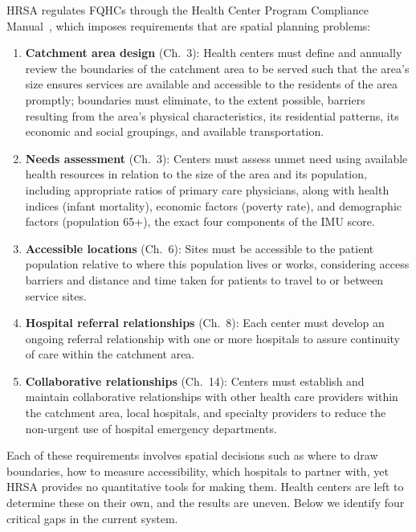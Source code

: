 \documentclass[11pt]{article}
\begin{document}
HRSA regulates FQHCs through the Health Center
Program Compliance Manual~\cite{bphc2025compliance},
which imposes requirements that are spatial
planning problems:

\begin{enumerate}[nosep, label=\textbf{R\arabic*.}]
    \item \label{r:catchment} \textbf{Catchment area design} (Ch.~3): Health centers must define and annually 
    review the boundaries of the catchment area to be served such that the area's size ensures services are 
    available and accessible to the residents of the area promptly; boundaries must eliminate, to the extent 
    possible, barriers resulting from the area's physical characteristics, its residential patterns, its economic 
    and social groupings, and available transportation.
    \item \label{r:needs} \textbf{Needs assessment} (Ch.~3): Centers must assess unmet need using available health 
    resources in relation to the size of the area and its population, including appropriate ratios of primary care 
    physicians, along with health indices (infant mortality), economic factors (poverty rate), and demographic 
    factors (population 65+), the exact four components of the IMU score.
    \item \label{r:locations} \textbf{Accessible locations} (Ch.~6): Sites must be accessible to the patient population 
    relative to where this population lives or works, considering access barriers and distance and time taken 
    for patients to travel to or between service sites.
    \item \label{r:referral} \textbf{Hospital referral relationships} (Ch.~8): Each center must develop an ongoing 
    referral relationship with one or more hospitals to assure continuity of care within the catchment area.
    \item \label{r:collaborative} \textbf{Collaborative relationships} (Ch.~14): Centers must establish and maintain 
    collaborative relationships with other health care providers within the catchment area, local hospitals, and 
    specialty providers to reduce the non-urgent use of hospital emergency departments.
\end{enumerate}

Each of these requirements involves spatial decisions such as where to draw boundaries, how to measure accessibility, 
which hospitals to partner with, yet HRSA provides no quantitative tools for making them. Health centers are left to 
determine these on their own, and the results are uneven. Below we identify four
critical gaps in the current system.
\end{document}
